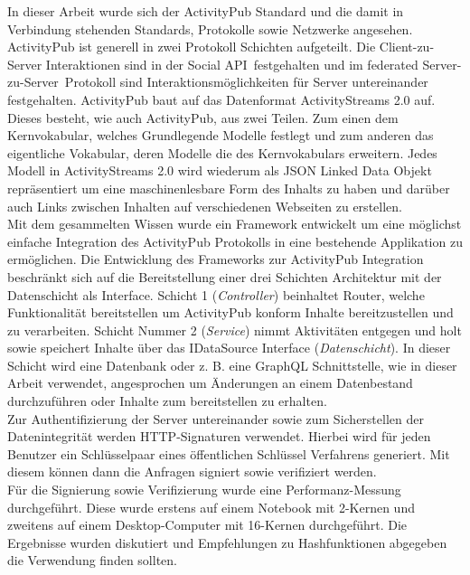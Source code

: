 

\Abstract
In dieser Arbeit wurde sich der ActivityPub Standard und die damit in Verbindung stehenden Standards, Protokolle sowie Netzwerke angesehen. ActivityPub ist generell in zwei Protokoll Schichten aufgeteilt. Die Client-zu-Server Interaktionen sind in der \glqq Social API\grqq~festgehalten und im \glqq federated Server-zu-Server\grqq~Protokoll sind Interaktionsmöglichkeiten für Server untereinander festgehalten. ActivityPub baut auf das Datenformat ActivityStreams 2.0 auf. Dieses besteht, wie auch ActivityPub, aus zwei Teilen. Zum einen dem Kernvokabular, welches Grundlegende Modelle festlegt und zum anderen das eigentliche Vokabular, deren Modelle die des Kernvokabulars erweitern. Jedes Modell in ActivityStreams 2.0 wird wiederum als JSON Linked Data Objekt repräsentiert um eine maschinenlesbare Form des Inhalts zu haben und darüber auch Links zwischen Inhalten auf verschiedenen Webseiten zu erstellen.\\

Mit dem gesammelten Wissen wurde ein Framework entwickelt um eine möglichst einfache Integration des ActivityPub Protokolls in eine bestehende Applikation zu ermöglichen. Die Entwicklung des Frameworks zur ActivityPub Integration beschränkt sich auf die Bereitstellung einer drei Schichten Architektur mit der Datenschicht als Interface. Schicht 1 (\textit{Controller}) beinhaltet Router, welche Funktionalität bereitstellen um ActivityPub konform Inhalte bereitzustellen und zu verarbeiten. Schicht Nummer 2 (\textit{Service}) nimmt Aktivitäten entgegen und holt sowie speichert Inhalte über das IDataSource Interface (\textit{Datenschicht}). In dieser Schicht wird eine Datenbank oder z. B. eine GraphQL Schnittstelle, wie in dieser Arbeit verwendet, angesprochen um Änderungen an einem Datenbestand durchzuführen oder Inhalte zum bereitstellen zu erhalten.\\

Zur Authentifizierung der Server untereinander sowie zum Sicherstellen der Datenintegrität werden HTTP-Signaturen verwendet. Hierbei wird für jeden Benutzer ein Schlüsselpaar eines öffentlichen Schlüssel Verfahrens generiert. Mit diesem können dann die Anfragen signiert sowie verifiziert werden.\\

Für die Signierung sowie Verifizierung wurde eine Performanz-Messung durchgeführt. Diese wurde erstens auf einem Notebook mit 2-Kernen und zweitens auf einem Desktop-Computer mit 16-Kernen durchgeführt. Die Ergebnisse wurden diskutiert und Empfehlungen zu Hashfunktionen abgegeben die Verwendung finden sollten.